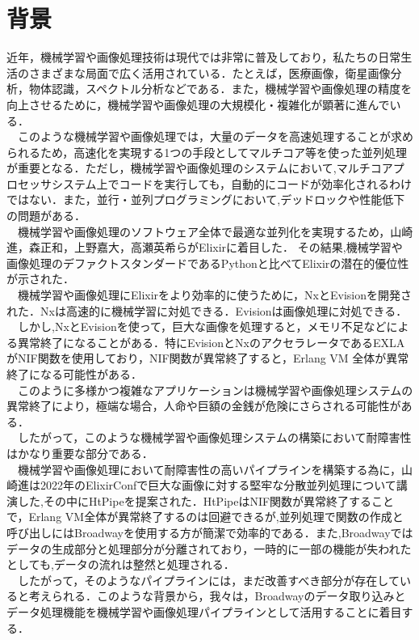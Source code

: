 \documentclass[a4paper]{jreport}	%
\begin{document}
\section{背景}
近年，機械学習や画像処理技術は現代では非常に普及しており，私たちの日常生活のさまざまな局面で広く活用されている．たとえば，医療画像，衛星画像分析，物体認識，スペクトル分析などである．また，機械学習や画像処理の精度を向上させるために，機械学習や画像処理の大規模化・複雑化が顕著に進んでいる\cite{A}．
\\　このような機械学習や画像処理では，大量のデータを高速処理することが求められるため，高速化を実現する1つの手段としてマルチコア等を使った並列処理が重要となる．ただし，機械学習や画像処理のシステムにおいて,マルチコアプロセッサシステム上でコードを実行しても，自動的にコードが効率化されるわけではない．また，並行・並列プログラミングにおいて,デッドロックや性能低下の問題がある\cite{B}．
\\　機械学習や画像処理のソフトウェア全体で最適な並列化を実現するため，山崎進，森正和，上野嘉大，高瀬英希らがElixirに着目した．
その結果,機械学習や画像処理のデファクトスタンダードであるPythonと比べてElixirの潜在的優位性が示された\cite{C}．
\\　機械学習や画像処理にElixirをより効率的に使うために，NxとEvisionを開発された．Nxは高速的に機械学習に対処できる．Evisionは画像処理に対処できる．
\\　しかし,NxとEvisionを使って，巨大な画像を処理すると，メモリ不足などによる異常終了になることがある．特にEvisionとNxのアクセラレータであるEXLAがNIF関数を使用しており，NIF関数が異常終了すると，Erlang VM 全体が異常終了になる可能性がある．
\\　このように多様かつ複雑なアプリケーションは機械学習や画像処理システムの異常終了により，極端な場合，人命や巨額の金銭が危険にさらされる可能性がある．
\\　したがって，このような機械学習や画像処理システムの構築において耐障害性はかなり重要な部分である．
\\　機械学習や画像処理において耐障害性の高いパイプラインを構築する為に，山崎進は2022年のElixirConfで巨大な画像に対する堅牢な分散並列処理について講演した,その中にHtPipeを提案された\cite{E}．HtPipeはNIF関数が異常終了することで，Erlang VM全体が異常終了するのは回避できるが,並列処理で関数の作成と呼び出しにはBroadwayを使用する方が簡潔で効率的である．また,Broadwayではデータの生成部分と処理部分が分離されており，一時的に一部の機能が失われたとしても,データの流れは整然と処理される．
\\　したがって，そのようなパイプラインには，まだ改善すべき部分が存在していると考えられる．このような背景から，我々は，Broadwayのデータ取り込みとデータ処理機能を機械学習や画像処理パイプラインとして活用することに着目する．
\end{document}
